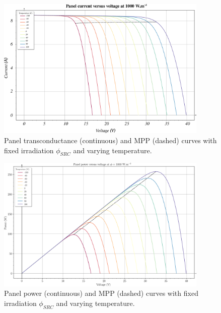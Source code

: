 \begin{figure}[h]
	\centering
	\includegraphics[angle = -90, width = 0.9\textwidth]{../images/pvPanelCurves/ivCurveVaryingTemperature.pdf}
	\caption{Panel transconductance (continuous) and MPP (dashed) curves with fixed irradiation $\phi_{SRC}$ and varying temperature.}
	\label{fig:ivCurveVaryingTemperature}
\end{figure}

\begin{figure}[h]
	\centering
	\includegraphics[angle = -90, width = 0.9\textwidth]{../images/pvPanelCurves/pvCurveVaryingTemperature.pdf}
	\caption{Panel power (continuous) and MPP (dashed) curves with fixed irradiation $\phi_{SRC}$ and varying temperature.}
	\label{fig:pvCurveVaryingTemperature}
\end{figure}

